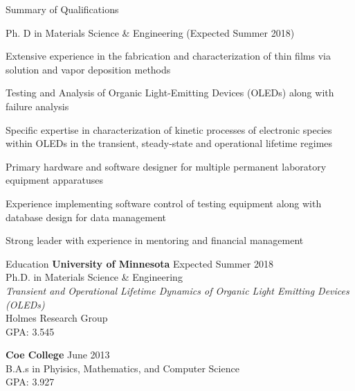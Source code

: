 \documentclass{resume} %
\begin{document}

\begin{rSection}{Summary of Qualifications}
\item Ph. D in Materials Science \& Engineering (Expected Summer 2018)
\item Extensive experience in the fabrication and characterization of thin films via solution and vapor deposition methods
\item Testing and Analysis of Organic Light-Emitting Devices (OLEDs) along with failure analysis
\item Specific expertise in characterization of kinetic processes of electronic species within OLEDs in the transient, steady-state and operational lifetime regimes
\item Primary hardware and software designer for multiple permanent laboratory equipment apparatuses
\item Experience implementing software control of testing equipment along with database design for data management 
\item Strong leader with experience in mentoring and financial management 


\end{rSection}


\begin{rSection}{Education}
{\bf University of Minnesota} \hfill { Expected Summer 2018} \\
Ph.D. in Materials Science \& Engineering \\
{\em Transient and Operational Lifetime Dynamics of Organic Light Emitting Devices (OLEDs)}\\
Holmes Research Group \\
GPA: 3.545

{\bf Coe College} \hfill { June 2013} \\ 
B.A.s in Phyisics, Mathematics, and Computer Science\\
GPA: 3.927 

\end{rSection}

\end{document}
